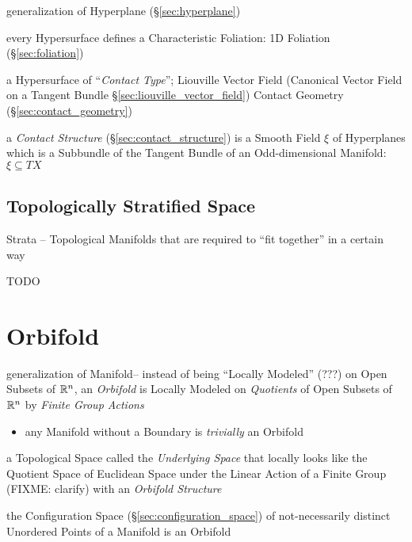 generalization of Hyperplane (\S\ref{sec:hyperplane})

every Hypersurface defines a Characteristic Foliation: 1D Foliation
(\S\ref{sec:foliation})

a Hypersurface of ``\emph{Contact Type}''; Liouville Vector Field (Canonical
Vector Field on a Tangent Bundle \S\ref{sec:liouville_vector_field}) \fist
Contact Geometry (\S\ref{sec:contact_geometry})

a \emph{Contact Structure} (\S\ref{sec:contact_structure}) is a Smooth Field
$\xi$ of Hyperplanes which is a Subbundle of the Tangent Bundle of an
Odd-dimensional Manifold: $\xi \subseteq T X$




\subsection{Topologically Stratified Space}\label{sec:topologically_stratified}

Strata -- Topological Manifolds that are required to ``fit together'' in a
certain way

TODO



\section{Orbifold}\label{sec:orbifold}

generalization of Manifold--
instead of being ``Locally Modeled'' (???) on Open Subsets of $\mathbb{R}^n$, an
\emph{Orbifold} is Locally Modeled on \emph{Quotients} of Open Subsets of
$\mathbb{R}^n$ by \emph{Finite Group Actions}

\begin{itemize}
  \item any Manifold without a Boundary is \emph{trivially} an Orbifold
\end{itemize}

a Topological Space called the \emph{Underlying Space} that locally looks like
the Quotient Space of Euclidean Space under the Linear Action of a Finite Group
(FIXME: clarify) with an \emph{Orbifold Structure}

the Configuration Space (\S\ref{sec:configuration_space}) of not-necessarily
distinct Unordered Points of a Manifold is an Orbifold



